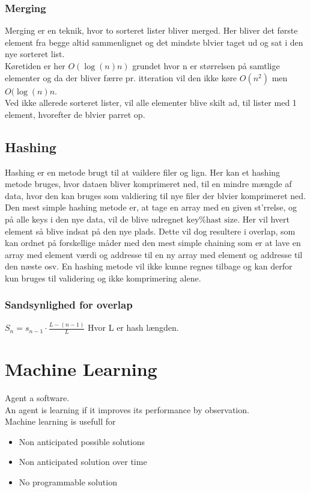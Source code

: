 \documentclass[12pt, a4paper]{article}
\begin{document}
				\subsubsection{Merging}
					Merging er en teknik, hvor to sorteret lister bliver merged. Her bliver det første element fra begge altid sammenlignet og det mindste blvier taget ud og sat i den nye sorteret list.\\
					Køretiden er her $O(\log(n)n)$ grundet hvor n er størrelsen på samtlige elementer og da der bliver færre pr. itteration vil den ikke køre $O(n^2)$ men $O(\log(n)n$.\\
					Ved ikke allerede sorteret lister, vil alle elementer blive skilt ad, til lister med 1 element, hvorefter de blvier parret op.
				\subsection{Hashing}
					Hashing er en metode brugt til at vaildere filer og lign. Her kan et hashing metode bruges, hvor dataen bliver komprimeret ned, til en mindre mængde af data, hvor den kan bruges som valdiering til nye filer der blvier komprimeret ned.\\
					Den mest simple hashing metode er, at tage en array med en given st'rrelse, og på alle keys i den nye data, vil de blive udregnet $\text{key}\%\text{hast size}$. Her vil hvert element så blive indsat på den nye plads. Dette vil dog resultere i overlap, som kan ordnet på forskellige måder med den mest simple chaining som er at lave en array med element værdi og addresse til en ny array med element og addresse til den næste osv.
					En hashing metode vil ikke kunne regnes tilbage og kan derfor kun bruges til validering og ikke komprimering alene.
					\subsubsection{Sandsynlighed for overlap}
						$S_n=s_{n-1}\cdot \frac{L-(n-1)}{L}$
						Hvor L er hash længden.
		\section{Machine Learning}
			Agent a software.\\
			An agent is learning if it improves its performance by observation.\\
			Machine learning is usefull for
			\begin{itemize}
				\item Non anticipated possible solutions
				\item Non anticipated solution over time
				\item No programmable solution
			\end{itemize}
\end{document}

